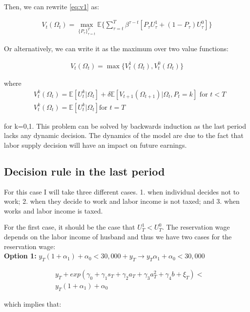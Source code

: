 \documentclass[11pt]{article}
\begin{document}
Then, we can rewrite \ref{eq:v1} as:

\begin{align}
	V_t(\Omega_t)=\max_{ \{P_\tau\}_{\tau=t}^T } \mathbb{E}\{ \sum_{\tau=t}^T \beta^{\tau-t}\left[ P_\tau U_\tau^1+(1-P_\tau)U_\tau^0\right] \}
\end{align}

Or alternatively, we can write it as the maximum over two value functions:

\begin{align}
	V_t(\Omega_t)=\max\{V_t^1(\Omega_t),V_t^0(\Omega_t) \}
\end{align}

where
\begin{align}
	& V_t^k(\Omega_t)= \mathbb{E}\left[ U_t^k|\Omega_{t} \right]+\delta  \mathbb{E}\left[ V_{t+1}(\Omega_{t+1})|\Omega_t,P_t=k \right] \text{ for } t<T\nonumber \\[0.2in]
	 & V_t^k(\Omega_t)= \mathbb{E}\left[ U_t^k|\Omega_{t} \right]\text{for }t=T
\end{align}

for k=0,1. This problem can be solved by backwards induction as the last period lacks any dynamic decision. The dynamics of the model are due to the fact that labor supply decision will have an impact on future earnings. 

\subsection{Decision rule in the last period}

For this case I will take three different cases. 1. when individual decides not to work; 2. when they decide to work and labor income is not taxed; and 3. when works and labor income is taxed. 

For the first case, it should be the case that $U_T^1<U_T^0$. The reservation wage depends on the labor income of husband and thus we have two cases for the reservation wage:
\\
\textbf{Option 1:} $y_T(1+\alpha_1)+\alpha_0<30,000+y_T\rightarrow y_T\alpha_1+\alpha_0<30,000$

\begin{align}\label{eq:rule1}
	& y_T+exp(\gamma_0+\gamma_1s_{T}+\gamma_2a_{T}+\gamma_3a_{T}^2+\gamma_4b+\xi_T) < \nonumber \\& y_T(1+\alpha_1)+\alpha_0
\end{align}

which implies that:
\end{document}
